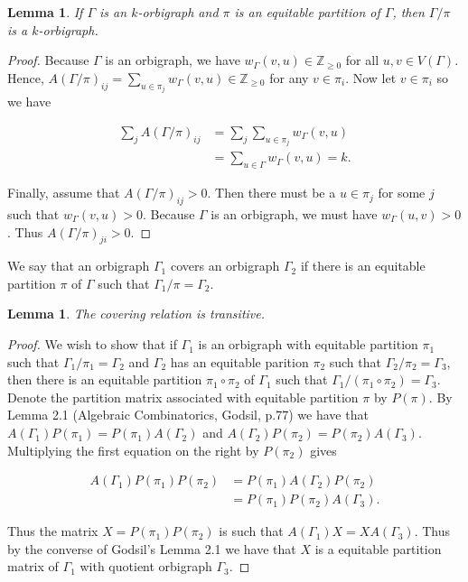 \documentclass[12pt]{article}
\theoremstyle{plain}
\newtheorem{lemma}[theorem]{Lemma}
\theoremstyle{definition}
\theoremstyle{remark}
\begin{document}
    \begin{lemma}\label{lemma:EqPartitionQuotient}
      If $\Gamma$ is an $k$-orbigraph and $\pi$ is an equitable partition of $\Gamma$, then $\Gamma / \pi$ is a $k$-orbigraph.
    \end{lemma}
    \begin{proof}
      Because $\Gamma$ is an orbigraph, we have $w_\Gamma(v, u) \in \mathbb{Z}_{\ge 0}$ for all $u, v \in V(\Gamma)$. Hence, $A(\Gamma / \pi)_{ij} = \sum_{u \in \pi_j} w_\Gamma(v, u) \in \mathbb{Z}_{\ge 0}$ for any $v \in \pi_i$. Now let $v \in \pi_i$ so we have
      
      \begin{align*}
        \sum_j A(\Gamma / \pi)_{ij} &= \sum_j \sum_{u \in \pi_j} w_\Gamma(v, u) \\
        &= \sum_{u \in \Gamma} w_\Gamma(v, u) = k.
      \end{align*}

      Finally, assume that $A(\Gamma / \pi)_{ij} > 0$. Then there must be a $u \in \pi_j$ for some $j$ such that $w_\Gamma(v, u) > 0$. Because $\Gamma$ is an orbigraph, we must have $w_\Gamma(u, v) > 0$. Thus $A(\Gamma / \pi)_{ji} > 0$.
    \end{proof}

    We say that an orbigraph $\Gamma_1$ covers an orbigraph $\Gamma_2$ if there is an equitable partition $\pi$ of $\Gamma$ such that $\Gamma_1 / \pi = \Gamma_2$.

    \begin{lemma}\label{lemma:CoveringTransitivity}
      The covering relation is transitive.
    \end{lemma}
    \begin{proof}
      We wish to show that if $\Gamma_1$ is an orbigraph with equitable partition $\pi_1$ such that $\Gamma_1 / \pi_1 = \Gamma_2$ and $\Gamma_2$ has an equitable parition $\pi_2$ such that $\Gamma_2 / \pi_2 = \Gamma_3$, then there is an equitable partition $\pi_1 \circ \pi_2$ of $\Gamma_1$ such that $\Gamma_1 / (\pi_1 \circ \pi_2) = \Gamma_3$. Denote the partition matrix associated with equitable partition $\pi$ by $P(\pi)$. By Lemma 2.1 (Algebraic Combinatorics, Godsil, p.77) we have that $A(\Gamma_1)P(\pi_1) = P(\pi_1)A(\Gamma_2)$ and $A(\Gamma_2)P(\pi_2) = P(\pi_2)A(\Gamma_3)$. Multiplying the first equation on the right by $P(\pi_2)$ gives
      
      \begin{align*}
        A(\Gamma_1)P(\pi_1)P(\pi_2) &= P(\pi_1)A(\Gamma_2)P(\pi_2) \\
        &= P(\pi_1)P(\pi_2)A(\Gamma_3).
      \end{align*}

      Thus the matrix $X = P(\pi_1)P(\pi_2)$ is such that $A(\Gamma_1) X = X A(\Gamma_3)$. Thus by the converse of Godsil's Lemma 2.1 we have that $X$ is a equitable partition matrix of $\Gamma_1$ with quotient orbigraph $\Gamma_3$.
    \end{proof}
\end{document}
